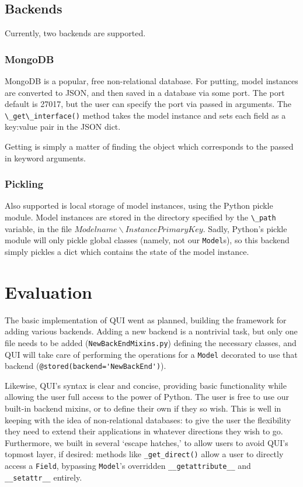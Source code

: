 \documentclass{article} %
\newcommand{\il}[1]{\mbox{\lstinline{#1}}}
\begin{document}
\subsection{Backends}
Currently, two backends are supported. 
\subsubsection{MongoDB}
	MongoDB is a  popular, free non-relational database. For putting, model instances are converted to JSON, and then saved in a database via some port. The port default is 27017,
	but the user can specify the port via passed in arguments. The \il{\_get\_interface()} method takes the model instance and sets each field as a key:value pair in the JSON
	dict.

	Getting is simply a matter of finding the object which corresponds to the passed in keyword arguments.
	
\subsubsection{Pickling}
	Also supported is local storage of model instances, using the Python pickle module. Model instances are stored in the directory specified by the \il{\_path} variable, in
	the file $Modelname\backslash InstancePrimaryKey$. Sadly, Python's pickle module will only pickle global classes (namely, not our \il{Model}s), so this backend simply pickles a dict
	which contains the state of the model instance.	
			
\newpage	
\section{Evaluation}
The basic implementation of QUI went as planned, building the framework for adding various backends. Adding a new backend is a nontrivial task, but only one file needs to be added
(\il{NewBackEndMixins.py}) defining the necessary classes, and QUI will take care of performing the operations for a \il{Model} decorated to use that backend (\il{@stored(backend='NewBackEnd')}).

Likewise, QUI's syntax is clear and concise, providing basic functionality while allowing the user full access to the power of Python. The user is free to use our built-in backend mixins, or 
to define their own if they so wish. This is well in keeping with the idea of non-relational databases: to give the user the flexibility they need to extend their applications in whatever
directions they wish to go. Furthermore, we built in several `escape hatches,' to allow users to avoid QUI's topmost layer, if desired: methods like \il{_get_direct()} allow a user to
directly access a \il{Field}, bypassing \il{Model}'s overridden \il{__getattribute__} and \il{__setattr__} entirely.
\end{document}
